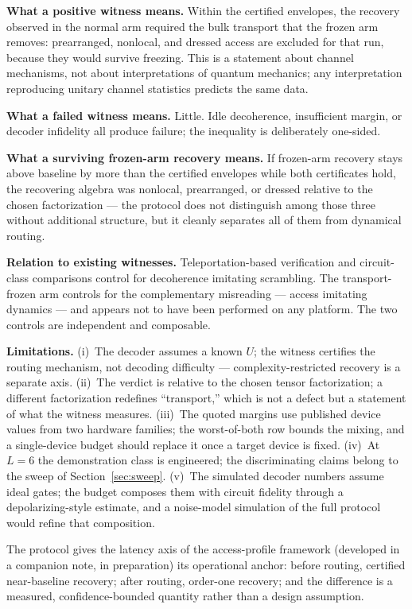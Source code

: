\documentclass[11pt]{article}
\begin{document}
\textbf{What a positive witness means.}  Within the certified
envelopes, the recovery observed in the normal arm required the bulk
transport that the frozen arm removes: prearranged, nonlocal, and
dressed access are excluded for that run, because they would survive
freezing.  This is
a statement about channel mechanisms, not about interpretations of
quantum mechanics; any interpretation reproducing unitary channel
statistics predicts the same data.

\textbf{What a failed witness means.}  Little.  Idle decoherence,
insufficient margin, or decoder infidelity all produce failure; the
inequality is deliberately one-sided.

\textbf{What a surviving frozen-arm recovery means.}  If frozen-arm
recovery stays above baseline by more than the certified envelopes
while both certificates hold, the recovering algebra was nonlocal,
prearranged, or dressed relative to the chosen factorization --- the
protocol does not distinguish among those three without additional
structure, but it cleanly separates all of them from dynamical
routing.

\textbf{Relation to existing witnesses.}  Teleportation-based
verification \citep{Landsman2019,Blok2021} and circuit-class
comparisons \citep{Mi2021,Wang2021} control for decoherence imitating
scrambling.  The transport-frozen arm controls for the complementary
misreading --- access imitating dynamics --- and appears not to have
been performed on any platform.  The two controls are independent
and composable.

\textbf{Limitations.}  (i)~The decoder assumes a known $U$; the
witness certifies the routing mechanism, not decoding difficulty ---
complexity-restricted recovery is a separate axis.  (ii)~The verdict
is relative to the chosen tensor factorization; a different
factorization redefines ``transport,'' which is not a defect but a
statement of what the witness measures.  (iii)~The quoted margins
use published device values from two hardware families; the
worst-of-both row bounds the mixing, and a single-device budget
should replace it once a target device is fixed.  (iv)~At $L = 6$
the demonstration class is engineered; the discriminating claims
belong to the sweep of Section~\ref{sec:sweep}.  (v)~The simulated decoder
numbers assume ideal gates; the budget composes them with circuit
fidelity through a depolarizing-style estimate, and a noise-model
simulation of the full protocol would refine that composition.

The protocol gives the latency axis of the access-profile framework
(developed in a companion note, in preparation) its operational
anchor: before routing, certified near-baseline recovery; after
routing, order-one recovery; and the difference is a measured,
confidence-bounded quantity rather than a design assumption.



\end{document}
